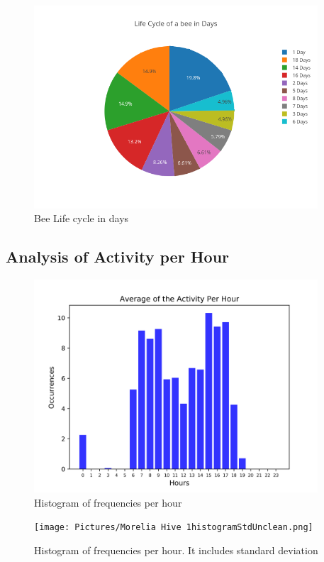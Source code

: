 \documentclass[11pt,fleqn]{book} %
\begin{document}
\begin{figure}[h!]%
\centering%
\includegraphics[width=400px]{Pictures/Morelia Hive 1pieBeeLifeCycleUnclean.png}%
\caption{Bee Life cycle in days}%
\end{figure}

%
\subsection{Analysis of Activity per Hour}%
\label{subsec:Analysis of Activity per Hour}%


\begin{figure}[h!]%
\centering%
\includegraphics[width=400px]{Pictures/Morelia Hive 1histogramUnclean.png}%
\caption{Histogram of frequencies per hour}%
\end{figure}

%


\begin{figure}[h!]%
\centering%
\texttt{[image: Pictures/Morelia Hive 1histogramStdUnclean.png]}%
\caption{Histogram of frequencies per hour. It includes standard deviation}%
\end{figure}
\end{document}
